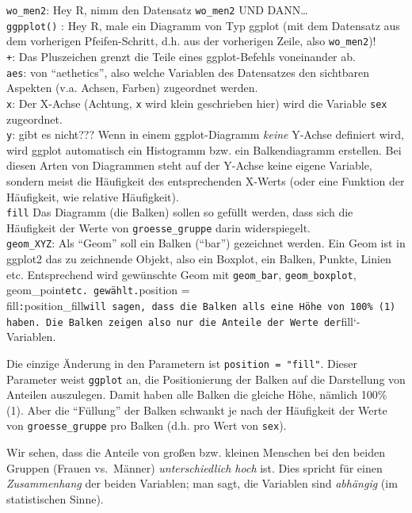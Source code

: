\documentclass[12pt,]{book}
\let\BeginKnitrBlock\begin \let\EndKnitrBlock\end
\begin{document}
\BeginKnitrBlock{rmdpseudocode}
\texttt{wo\_men2}: Hey R, nimm den Datensatz \texttt{wo\_men2} UND
DANN\ldots{}\\
\texttt{ggpplot()} : Hey R, male ein Diagramm von Typ ggplot (mit dem
Datensatz aus dem vorherigen Pfeifen-Schritt, d.h. aus der vorherigen
Zeile, also \texttt{wo\_men2})!\\
\texttt{+}: Das Pluszeichen grenzt die Teile eines ggplot-Befehls
voneinander ab.\\
\texttt{aes}: von ``aethetics'', also welche Variablen des Datensatzes
den sichtbaren Aspekten (v.a. Achsen, Farben) zugeordnet werden.\\
\texttt{x}: Der X-Achse (Achtung, \texttt{x} wird klein geschrieben
hier) wird die Variable \texttt{sex} zugeordnet.\\
\texttt{y}: gibt es nicht??? Wenn in einem ggplot-Diagramm \emph{keine}
Y-Achse definiert wird, wird ggplot automatisch ein Histogramm bzw. ein
Balkendiagramm erstellen. Bei diesen Arten von Diagrammen steht auf der
Y-Achse keine eigene Variable, sondern meist die Häufigkeit des
entsprechenden X-Werts (oder eine Funktion der Häufigkeit, wie relative
Häufigkeit).\\
\texttt{fill} Das Diagramm (die Balken) sollen so gefüllt werden, dass
sich die Häufigkeit der Werte von \texttt{groesse\_gruppe} darin
widerspiegelt.\\
\texttt{geom\_XYZ}: Als ``Geom'' soll ein Balken (``bar'') gezeichnet
werden. Ein Geom ist in ggplot2 das zu zeichnende Objekt, also ein
Boxplot, ein Balken, Punkte, Linien etc. Entsprechend wird gewünschte
Geom mit \texttt{geom\_bar}, \texttt{geom\_boxplot},
geom\_point\texttt{etc.\ gewählt.}position =
fill\texttt{:}position\_fill\texttt{will\ sagen,\ dass\ die\ Balken\ alls\ eine\ Höhe\ von\ 100\%\ (1)\ haben.\ Die\ Balken\ zeigen\ also\ nur\ die\ Anteile\ der\ Werte\ der}fill`-Variablen.
\EndKnitrBlock{rmdpseudocode}

Die einzige Änderung in den Parametern ist \texttt{position\ =\ "fill"}.
Dieser Parameter weist \texttt{ggplot} an, die Positionierung der Balken
auf die Darstellung von Anteilen auszulegen. Damit haben alle Balken die
gleiche Höhe, nämlich 100\% (1). Aber die ``Füllung'' der Balken
schwankt je nach der Häufigkeit der Werte von \texttt{groesse\_gruppe}
pro Balken (d.h. pro Wert von \texttt{sex}).

Wir sehen, dass die Anteile von großen bzw. kleinen Menschen bei den
beiden Gruppen (Frauen vs.~Männer) \emph{unterschiedlich hoch} ist. Dies
spricht für einen \emph{Zusammenhang} der beiden Variablen; man sagt,
die Variablen sind \emph{abhängig} (im statistischen Sinne).
\end{document}
